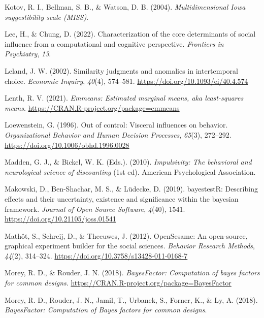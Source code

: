 \documentclass[
  pub,floatsintext]{apa6}
\newlength{\cslhangindent}
\newlength{\cslentryspacingunit} %
\newenvironment{CSLReferences}[2] %
 {%
  \setlength{\parindent}{0pt}
  \ifodd #1
  \let\oldpar\par
  \def\par{\hangindent=\cslhangindent\oldpar}
  \fi
  \setlength{\parskip}{#2\cslentryspacingunit}
 }%
 {}
\begin{document}
\begin{CSLReferences}{1}{0}
\leavevmode{}%
Kotov, R. I., Bellman, S. B., \& Watson, D. B. (2004). \emph{Multidimensional {Iowa} suggestibility scale ({MISS})}.

\leavevmode{}%
Lee, H., \& Chung, D. (2022). Characterization of the core determinants of social influence from a computational and cognitive perspective. \emph{Frontiers in Psychiatry}, \emph{13}.

\leavevmode{}%
Leland, J. W. (2002). Similarity judgments and anomalies in intertemporal choice. \emph{Economic Inquiry}, \emph{40}(4), 574--581. \url{https://doi.org/10.1093/ei/40.4.574}

\leavevmode{}%
Lenth, R. V. (2021). \emph{Emmeans: Estimated marginal means, aka least-squares means}. \url{https://CRAN.R-project.org/package=emmeans}

\leavevmode{}%
Loewenstein, G. (1996). Out of control: {Visceral} influences on behavior. \emph{Organizational Behavior and Human Decision Processes}, \emph{65}(3), 272--292. \url{https://doi.org/10.1006/obhd.1996.0028}

\leavevmode{}%
Madden, G. J., \& Bickel, W. K. (Eds.). (2010). \emph{Impulsivity: The behavioral and neurological science of discounting} (1st ed). {American Psychological Association}.

\leavevmode{}%
Makowski, D., Ben-Shachar, M. S., \& Lüdecke, D. (2019). bayestestR: Describing effects and their uncertainty, existence and significance within the bayesian framework. \emph{Journal of Open Source Software}, \emph{4}(40), 1541. \url{https://doi.org/10.21105/joss.01541}

\leavevmode{}%
Mathôt, S., Schreij, D., \& Theeuwes, J. (2012). {OpenSesame}: {An} open-source, graphical experiment builder for the social sciences. \emph{Behavior Research Methods}, \emph{44}(2), 314--324. \url{https://doi.org/10.3758/s13428-011-0168-7}

\leavevmode{}%
Morey, R. D., \& Rouder, J. N. (2018). \emph{BayesFactor: Computation of bayes factors for common designs}. \url{https://CRAN.R-project.org/package=BayesFactor}

\leavevmode{}%
Morey, R. D., Rouder, J. N., Jamil, T., Urbanek, S., Forner, K., \& Ly, A. (2018). \emph{{BayesFactor}: {Computation} of {Bayes} factors for common designs}.


\end{CSLReferences}
\end{document}
